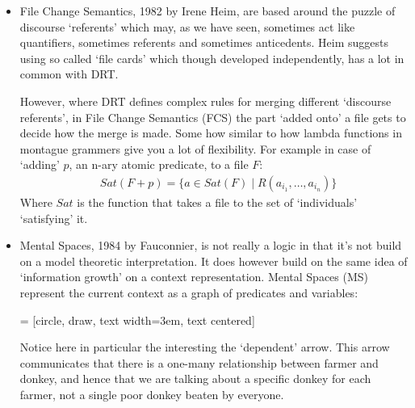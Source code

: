 \documentclass[12pt]{article}
\begin{document}
\begin{itemize}
\item File Change Semantics, 1982 by Irene Heim\cite{heim1983file}, are based around the puzzle of discourse `referents' which may, as we have seen, sometimes act like quantifiers, sometimes referents and sometimes anticedents. Heim suggests using so called `file cards' which though developed independently, has a lot in common with DRT.

However, where DRT defines complex rules for merging different `discourse referents', in File Change Semantics (FCS) the part `added onto' a file gets to decide how the merge is made. Some how similar to how lambda functions in montague grammers give you a lot of flexibility. For example in case of `adding' $p$, an n-ary atomic predicate, to a file $F$:
%
\begin{align}
&Sat(F + p) = \{a \in Sat(F) \mid R(a_{i_1}, \dots, a_{i_n})\} \nonumber
\end{align}
%
Where $Sat$ is the function that takes a file to the set of `individuals' `satisfying' it.

\item Mental Spaces, 1984 by Fauconnier\cite{fauconnier1984espaces}, is not really a logic in that it's not build on a model theoretic interpretation. It does however build on the same idea of `information growth' on a context representation. Mental Spaces (MS) represent the current context as a graph of predicates and variables:

 = [circle, draw, text width=3em, text centered]

Notice here in particular the interesting the `dependent' arrow. This arrow communicates that there is a one-many relationship between farmer and donkey, and hence that we are talking about a specific donkey for each farmer, not a single poor donkey beaten by everyone.


\end{itemize}
\end{document}
